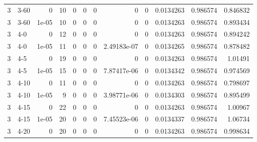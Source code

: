 \begin{tabular}{rlrrrrrrrrrr}
     3 & 3-60   &      0     &          10 &                 0 &                 0 &     0           &     0           &      0           &        0.0134263 &               0.986574 &           0.846832 \\
     3 & 3-60   &      1e-05 &          10 &                 0 &                 0 &     0           &     0           &      0           &        0.0134263 &               0.986574 &           0.893434 \\
     3 & 4-0    &      0     &          12 &                 0 &                 0 &     0           &     0           &      0           &        0.0134263 &               0.986574 &           0.894242 \\
     3 & 4-0    &      1e-05 &          11 &                 0 &                 0 &     0           &     2.49183e-07 &      0           &        0.0134265 &               0.986574 &           0.878482 \\
     3 & 4-5    &      0     &          19 &                 0 &                 0 &     0           &     0           &      0           &        0.0134263 &               0.986574 &           1.01491  \\
     3 & 4-5    &      1e-05 &          15 &                 0 &                 0 &     0           &     7.87417e-06 &      0           &        0.0134342 &               0.986574 &           0.974569 \\
     3 & 4-10   &      0     &          11 &                 0 &                 0 &     0           &     0           &      0           &        0.0134263 &               0.986574 &           0.798697 \\
     3 & 4-10   &      1e-05 &           9 &                 0 &                 0 &     0           &     3.98771e-06 &      0           &        0.0134303 &               0.986574 &           0.895499 \\
     3 & 4-15   &      0     &          22 &                 0 &                 0 &     0           &     0           &      0           &        0.0134263 &               0.986574 &           1.00967  \\
     3 & 4-15   &      1e-05 &          20 &                 0 &                 0 &     0           &     7.45523e-06 &      0           &        0.0134337 &               0.986574 &           1.06734  \\
     3 & 4-20   &      0     &          20 &                 0 &                 0 &     0           &     0           &      0           &        0.0134263 &               0.986574 &           0.998634 \\

\end{tabular}
